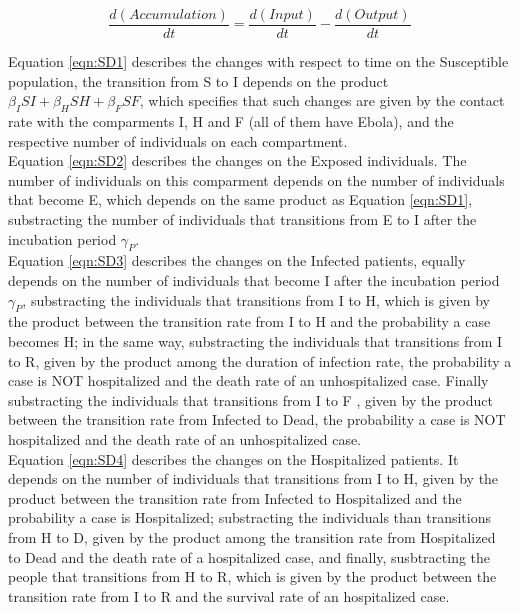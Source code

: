 \begin{equation}
\frac{d (Accumulation)}{dt} = \frac{d (Input)}{dt} -\frac{d (Output)}{dt} \nonumber
\end{equation}


Equation \ref{eqn:SD1} describes the changes with respect to time on the Susceptible population, the transition from S to I depends on the product $\beta_{I}SI+\beta_{H}SH+\beta_{F}SF$, which specifies that such changes are given by the contact rate with the comparments I, H and F (all of them have Ebola), and the respective number of individuals on each compartment.\\

Equation \ref{eqn:SD2} describes the changes on the Exposed individuals. The number of individuals on this comparment depends on the number of individuals that become E, which depends on the same product as Equation \ref{eqn:SD1}, substracting the number of individuals that transitions from E to I after the incubation period $\gamma_P$.\\

Equation \ref{eqn:SD3} describes the changes on the Infected patients, equally depends on the number of individuals that become I after the incubation period $\gamma_P$, substracting the individuals that transitions from I to H, which is given by the product between the transition rate from I to H and the probability a case becomes H; in the same way, substracting the individuals that transitions from I to R, given by  the product among the duration of infection rate, the probability a case is NOT hospitalized and the death rate of an unhospitalized case. Finally substracting the individuals that transitions from I to F , given by the product between the transition rate from Infected to Dead,  the probability a case is NOT hospitalized and the death rate of an unhospitalized case.\\

Equation \ref{eqn:SD4} describes the changes on the Hospitalized patients. It depends on the number of individuals that transitions from I to H, given by the  product between the transition rate from Infected to Hospitalized and the probability a case is Hospitalized;  substracting the individuals than transitions from H to D, given by the product among the transition rate from Hospitalized to Dead and the death rate of a hospitalized case, and finally, susbtracting the people that transitions from H to R, which is given by the product between the transition rate from I to R and the survival rate of an hospitalized case.\\

